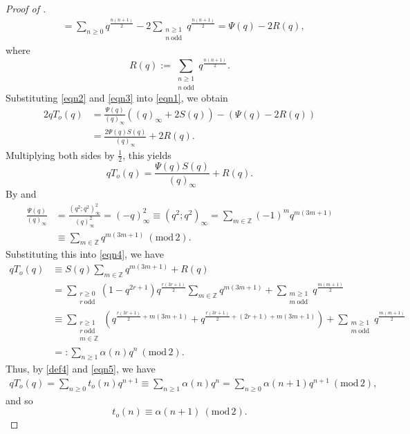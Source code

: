 \documentclass[10pt,a4paper]{amsart}
\renewcommand{\a}{\alpha}
\renewcommand{\r}{{\rho}}
\renewcommand{\(}{\left\(}
\renewcommand{\)}{\right\)}
\numberwithin{equation}{section}
\numberwithin{equation}{section}
\renewcommand{\pmod}[1]{\ \left( \mathrm{mod} \, #1 \right)}
\begin{document}
\begin{proof}[Proof of ]
\begin{align}
&=\sum_{n\ge 0} q^{\frac{n(n+1)}{2}}-2\sum_{\substack{n\ge 1\\n\ \text{odd}}} q^{\frac{n(n+1)}{2}}=\Psi(q)-2R(q),
\end{align}
where
\[
R(q):=\sum_{\substack{n\ge 1\\n\ \text{odd}}} q^{\frac{n(n+1)}{2}}.
\]
Substituting \eqref{eqn2} and \eqref{eqn3} into \eqref{eqn1}, we obtain
\begin{align*}
2qT_o(q)&=\frac{\Psi(q)}{(q)_{\infty}}\left((q)_{\infty}+2S(q)\right)-\left(\Psi(q)-2R(q)\right)\nonumber\\
&=\frac{2\Psi(q)S(q)}{(q)_{\infty}}+2R(q).
\end{align*}
Multiplying both sides by $\frac 12$, this yields
\begin{equation}\label{eqn4}
qT_o(q)=\frac{\Psi(q)S(q)}{(q)_{\infty}}+R(q).
\end{equation}
By  and 
\begin{align*}
\frac{\Psi(q)}{(q)_{\infty}}&=\frac{\left(q^2;q^2\right)^2_{\infty}}{(q)^2_{\infty}}=(-q)^2_{\infty}\equiv \left(q^2;q^2\right)_{\infty}%
=\sum_{m\in \mathbb{Z}}(-1)^m q^{m(3m+1)}\\%
&\equiv \sum_{m\in \mathbb{Z}} q^{m(3m+1)}\pmod{2}.
\end{align*}
Substituting this into \eqref{eqn4}, we have
\begin{align}\label{eqn5}
qT_o(q)&\equiv S(q)\sum_{m\in \mathbb{Z}} q^{m(3m+1)}+R(q)\nonumber\\%
&=\sum_{\substack{r\ge 0\\r\ \text{odd}}} \left(1-q^{2r+1}\right)q^{\frac{r(3r+1)}{2}}\sum_{m\in \mathbb{Z}} q^{m(3m+1)}+\sum_{\substack{m\ge 1\\m\ \text{odd}}} q^{\frac{m(m+1)}{2}}\nonumber\\
&\equiv\sum_{\substack{r\ge 1\\r\ \text{odd}\\m\in \mathbb{Z}}}\left(q^{\frac{r(3r+1)}{2}+m(3m+1)}+q^{\frac{r(3r+1)}{2}+(2r+1)+m(3m+1)}\right)+\sum_{\substack{m\ge 1\\m\ \text{odd}}} q^{\frac{m(m+1)}{2}}\nonumber\\
&=:\sum_{n\ge 1}\a(n)q^n\pmod{2}.
\end{align}
Thus, by \eqref{def4} and \eqref{eqn5}, we have
\begin{align*}
qT_o(q)=\sum_{n\ge 0}t_o(n)q^{n+1}\equiv\sum_{n\ge 1}\a(n)q^n= \sum_{n\ge 0}\a(n+1)q^{n+1} \pmod{2},
\end{align*}
and so 
\[
t_o(n)\equiv \a(n+1)\pmod{2}.
\]


\end{proof}
\end{document}
